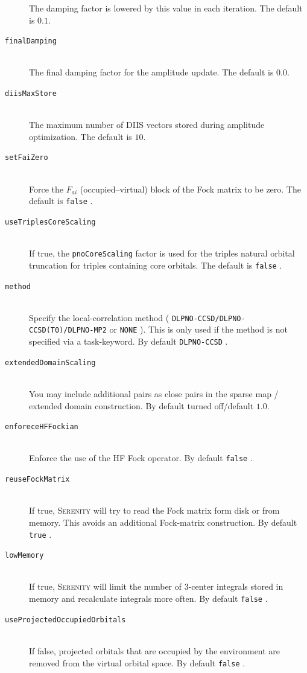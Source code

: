\documentclass[bibliography=totocnumbered,a4paper,10pt,oneside]{scrbook}
\newcommand{\ttt}[1]{%
  \begingroup\setlength{\fboxsep}{1pt}%
  \colorbox{serenity-green!30}{\texttt{\hspace*{2pt}\vphantom{(g}#1\hspace*{2pt}}}%
  \endgroup
}
\begin{document}
\begin{description}
    The damping factor is lowered by this value in each iteration. The default is $0.1$.
    \item [\texttt{finalDamping}]\hfill \\
    The final damping factor for the amplitude update. The default is $0.0$.
    \item [\texttt{diisMaxStore}]\hfill \\
    The maximum number of DIIS vectors stored during amplitude optimization. The default is $10$.
    \item [\texttt{setFaiZero}]\hfill \\
    Force the $F_{ai}$ (occupied--virtual) block of the Fock matrix to be zero. The default is \ttt{false}.
    \item [\texttt{useTriplesCoreScaling}]\hfill \\
    If true, the \texttt{pnoCoreScaling} factor is used for the triples natural orbital truncation for
    triples containing core orbitals. The default is \ttt{false}.
    \item [\texttt{method}]\hfill \\
    Specify the local-correlation method (\ttt{DLPNO-CCSD/DLPNO-CCSD(T0)/DLPNO-MP2} or \ttt{NONE}). This is only used if the method
    is not specified via a task-keyword. By default \ttt{DLPNO-CCSD}.
    \item [\texttt{extendedDomainScaling}]\hfill \\
    You may include additional pairs as close pairs in the sparse map / extended
    domain construction. By default turned off/default $1.0$.
    \item [\texttt{enforeceHFFockian}]\hfill \\
    Enforce the use of the HF Fock operator. By default \ttt{false}.
    \item [\texttt{reuseFockMatrix}]\hfill \\
    If true, \textsc{Serenity} will try to read the Fock matrix form disk or from memory.
    This avoids an additional Fock-matrix construction. By default \ttt{true}.
    \item [\texttt{lowMemory}]\hfill \\
    If true, \textsc{Serenity} will limit the number of 3-center integrals stored in memory
    and recalculate integrals more often. By default \ttt{false}.
    \item [\texttt{useProjectedOccupiedOrbitals}]\hfill \\
    If false, projected orbitals that are occupied by the environment are removed from the virtual orbital space. By default \ttt{false}.
 \end{description}
\end{document}
